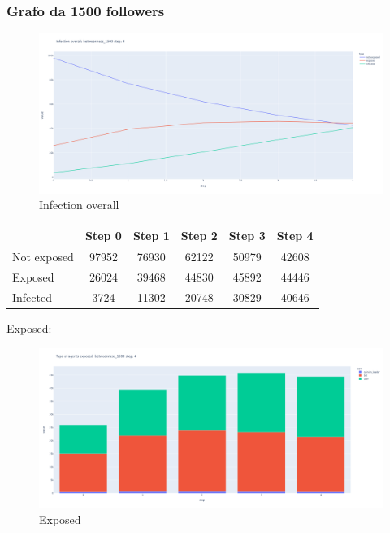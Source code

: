         \subsubsection{Grafo da 1500 followers}
        \begin{figure}[H]
                \includegraphics[width=16cm]{resources/charts/btw_1500_line.png}
                \caption{Infection overall}
                \label{fig:btw_1500_line}
        \end{figure}
        \begin{table}[H]
            \centering
            \begin{tabular}{|l|c|c|c|c|c|}
            \hline
                        & Step 0 & Step 1 & Step 2 & Step 3 & Step 4 \\ \hline
            Not exposed & 97952  & 76930  & 62122  & 50979  & 42608  \\ \hline
            Exposed     & 26024  & 39468  & 44830  & 45892  & 44446  \\ \hline
            Infected    & 3724   & 11302  & 20748  & 30829  & 40646  \\ \hline
            \end{tabular}
        \end{table}
        
        Exposed:
        \begin{figure}[H]
            \includegraphics[width=16cm]{resources/charts/btw_1500_bar.png}
            \caption{Exposed}
            \label{fig:btw_1500_bar}
        \end{figure}
        
